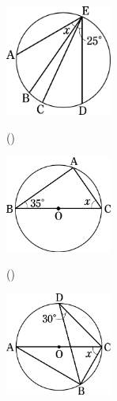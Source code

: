 \documentclass[
  12pt,a4paper,lualatex,ja=standard]{bxjsarticle}
\begin{document}
\begin{flushleft}
\begin{multicols}{2}
\begin{center}
\def\@captype{figure}
\includegraphics[width=35mm]{img/image6.jpg}

\end{center}

\end{multicols}

\vfill

\begin{multicols}{2}
()\hspace{2.5pt}

\begin{center}
\def\@captype{figure}
\includegraphics[width=35mm]{img/image7.jpg}

\end{center}

()\hspace{2.5pt}

\begin{center}
\def\@captype{figure}
\includegraphics[width=35mm]{img/image8.jpg}

\end{center}

\end{multicols}

\vfill

\newpage

\setcounter{skaunta}{0}


\end{flushleft}
\end{document}
